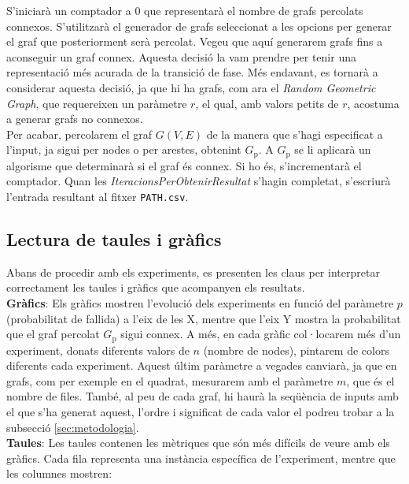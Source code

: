 \documentclass[a4paper]{article}
\begin{document}
	S'iniciarà un comptador a 0 que representarà el nombre de grafs percolats connexos. S'utilitzarà el generador de grafs seleccionat a les opcions per generar el graf que posteriorment serà percolat. Vegeu que aquí generarem grafs fins a aconseguir un graf connex. Aquesta decisió la vam prendre per tenir una representació més acurada de la transició de fase. Més endavant, es tornarà a considerar aquesta decisió, ja que hi ha grafs, com ara el \textit{Random Geometric Graph}, que requereixen un paràmetre $r$, el qual, amb valors petits de $r$, acostuma a generar grafs no connexos. \\
	
	Per acabar, percolarem el graf $G(V,E)$ de la manera que s'hagi especificat a l'input, ja sigui per nodes o per arestes, obtenint $G_{\text{p}}$. A $G_{\text{p}}$ se li aplicarà un algorisme que determinarà si el graf és connex. Si ho és, s'incrementarà el comptador. Quan les \textit{IteracionsPerObtenirResultat} s'hagin completat, s'escriurà l'entrada resultant al fitxer \texttt{PATH.csv}.
	
	\subsection{Lectura de taules i gràfics}
	
	Abans de procedir amb els experiments, es presenten les claus per interpretar correctament les taules i gràfics que acompanyen els resultats. \\
	
	\textbf{Gràfics}: Els gràfics mostren l'evolució dels experiments en funció del paràmetre $p$ (probabilitat de fallida) a l'eix de les X, mentre que l'eix Y mostra la probabilitat que el graf percolat $G_{\text{p}}$ sigui connex. A més, en cada gràfic col·locarem més d'un experiment, donats diferents valors de $n$ (nombre de nodes), pintarem de colors diferents cada experiment. Aquest últim paràmetre a vegades canviarà, ja que en grafs, com per exemple en el quadrat, mesurarem amb el paràmetre $m$, que és el nombre de files. També, al peu de cada graf, hi haurà la seqüència de inputs amb el que s'ha generat aquest, l'ordre i significat de cada valor el podreu trobar a la subsecció \ref{sec:metodologia}. \\
	
	\textbf{Taules}: Les taules contenen les mètriques que són més difícils de veure amb els gràfics. Cada fila representa una instància específica de l'experiment, mentre que les columnes mostren:
	
\end{document}
